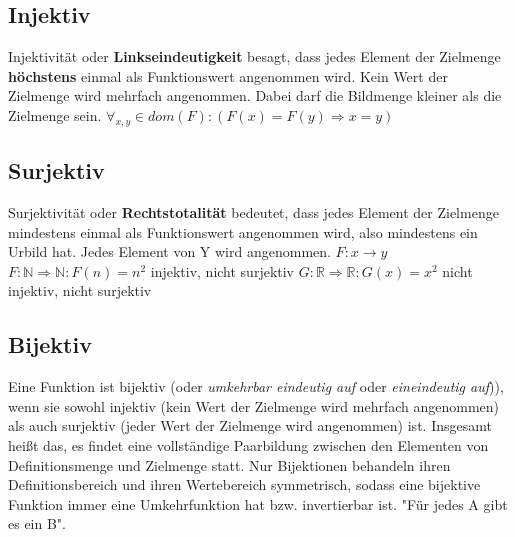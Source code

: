 \subsection{Injektiv}
Injektivität oder \textbf{Linkseindeutigkeit} besagt, dass jedes
    Element der Zielmenge \textbf{höchstens} einmal als Funktionswert angenommen
    wird. Kein Wert der Zielmenge wird mehrfach angenommen. Dabei darf die Bildmenge kleiner als die Zielmenge sein.\newline
\( \forall_{x,y} \in dom(F): (F(x) = F(y) \Rightarrow x = y) \)

\subsection{Surjektiv}
Surjektivität oder \textbf{Rechtstotalität} bedeutet, dass jedes
    Element der Zielmenge mindestens einmal als Funktionswert angenommen
    wird, also mindestens ein Urbild hat. Jedes Element von Y wird
    angenommen.
\(F: x \rightarrow y\) \newline
\(F: \mathbb{N} \Rightarrow \mathbb{N}: F(n) = n^2 \) injektiv, nicht surjektiv\newline
\(G: \mathbb{R} \Rightarrow \mathbb{R}: G(x) = x^2 \) nicht injektiv, nicht surjektiv\newline

\subsection{Bijektiv}
Eine Funktion ist bijektiv (oder \emph{umkehrbar eindeutig auf} oder
    \emph{eineindeutig auf})), wenn sie sowohl injektiv (kein Wert der
    Zielmenge wird mehrfach angenommen) als auch surjektiv (jeder Wert der
    Zielmenge wird angenommen) ist. Insgesamt heißt das, es findet eine
    vollständige Paarbildung zwischen den Elementen von Definitionsmenge
    und Zielmenge statt. Nur Bijektionen behandeln ihren Definitionsbereich
    und ihren Wertebereich symmetrisch, sodass eine bijektive Funktion
    immer eine Umkehrfunktion hat bzw. invertierbar ist. "Für jedes A gibt
    es ein B".